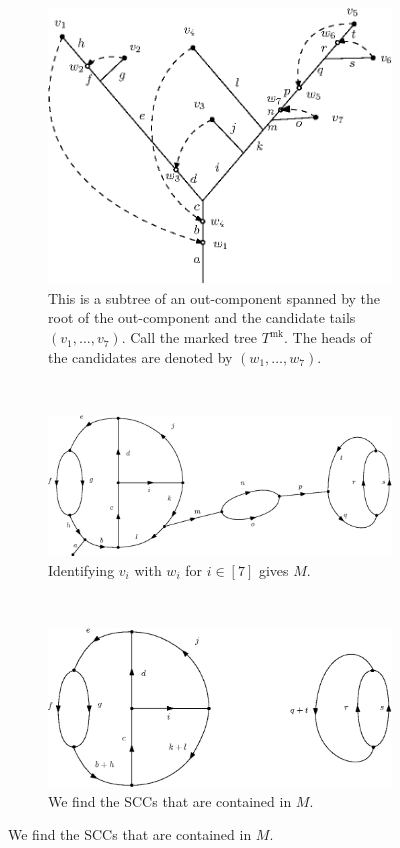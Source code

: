 \begin{figure}
\centering
\begin{subfigure}{.7\textwidth}
 \centering
    \includegraphics[width=0.8\linewidth]{Content/Pictures/out_componentswithmarks.eps}
    \caption{This is a subtree of an out-component spanned by the root of the out-component and the candidate tails $(v_1,\dots,v_7)$. Call the marked tree $T^{\mathrm{mk}}$. The heads of the candidates are denoted by $(w_1,\dots,w_7)$. }
\label{figure.extractSCCs1}
\end{subfigure}\\
\vspace{1.5em}
\begin{subfigure}{.8\textwidth}
  \centering
  \includegraphics[width=0.9\linewidth]{Content/Pictures/identification.eps}
  \caption{Identifying $v_i$ with $w_i$ for $i\in [7]$ gives $M$.}
  \label{figure.extractSCCs2}
\end{subfigure}\\
\vspace{1.5em}
\begin{subfigure}{.8\textwidth}
  \centering
  \includegraphics[width=0.9\linewidth]{Content/Pictures/cutting.eps}
  \caption{We find the SCCs that are contained in $M$.}
  \label{figure.extractSCCs3}
\end{subfigure}


\end{figure}
